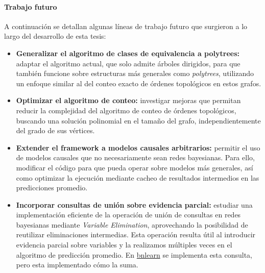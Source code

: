 \paragraph{Trabajo futuro}

A continuación se detallan algunas líneas de trabajo futuro que surgieron a lo largo del desarrollo de esta tesis:

\begin{itemize}
  \item \textbf{Generalizar el algoritmo de clases de equivalencia a polytrees:} adaptar el algoritmo actual, que solo admite árboles dirigidos, para que también funcione sobre estructuras más generales como \emph{polytrees}, utilizando un enfoque similar al del conteo exacto de órdenes topológicos en estos grafos.

  \item \textbf{Optimizar el algoritmo de conteo:} investigar mejoras que permitan reducir la complejidad del algoritmo de conteo de órdenes topológicos, buscando una solución polinomial en el tamaño del grafo, independientemente del grado de sus vértices.

  \item \textbf{Extender el framework a modelos causales arbitrarios:} permitir el uso de modelos causales que no necesariamente sean redes bayesianas. Para ello, modificar el código para que pueda operar sobre modelos más generales, así como optimizar la ejecución mediante cacheo de resultados intermedios en las predicciones promedio.


  \item \textbf{Incorporar consultas de unión sobre evidencia parcial:} estudiar una implementación eficiente de la operación de unión de consultas en redes bayesianas mediante \emph{Variable Elimination}, aprovechando la posibilidad de reutilizar eliminaciones intermedias. Esta operación resulta útil al introducir evidencia parcial sobre variables y la realizamos múltiples veces en el algoritmo de predicción promedio.
  En \href{https://rdrr.io/github/vspinu/bnlearn/man/cpquery.html#:~:text=When%20,be%20treated%20as%20a%20list}{bnlearn} se implementa esta consulta, pero esta implementado cómo la suma. 


\end{itemize}
